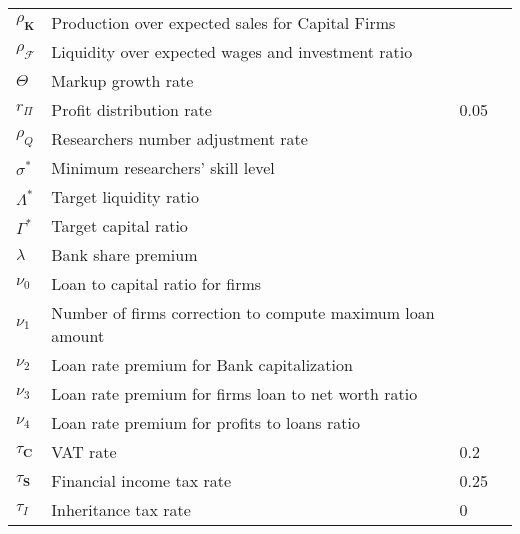 \documentclass[a4paper, headings=standardclasses]{scrartcl}
\begin{document}
\begin{tabularx}{\linewidth}{lXll}
    $\rho_\mathbf{K}$            & Production over expected sales for Capital Firms             &       &        \\
    $\rho_\mathcal{F}$           & Liquidity over expected wages and investment ratio           &       &        \\
    $\Theta$                     & Markup growth rate                                           &       &        \\
    $r_\Pi$                      & Profit distribution rate                                     & 0.05  &        \\
    $\rho_Q$                     & Researchers number adjustment rate                           &       &        \\
    $\sigma^*$                   & Minimum researchers' skill level                             &       &        \\
    $\Lambda^*$                  & Target liquidity ratio                                       &       &        \\
    $\Gamma^*$                   & Target capital ratio                                         &       &        \\
    $\lambda$                    & Bank share premium                                           &       &        \\
    $\nu_0$                      & Loan to capital ratio for firms                              &       &        \\
    $\nu_1$                      & Number of firms correction to compute maximum loan amount    &       &        \\
    $\nu_2$                      & Loan rate premium for Bank capitalization                    &       &        \\
    $\nu_3$                      & Loan rate premium for firms loan to net worth ratio          &       &        \\
    $\nu_4$                      & Loan rate premium for profits to loans ratio                 &       &        \\
    $\tau_\mathbf{C}$            & VAT rate                                                     & 0.2   &        \\
    $\tau_\mathbf{S}$            & Financial income tax rate                                    & 0.25  &        \\
    $\tau_I$                     & Inheritance tax rate                                         & 0     &        \\

\end{tabularx}
\end{document}
